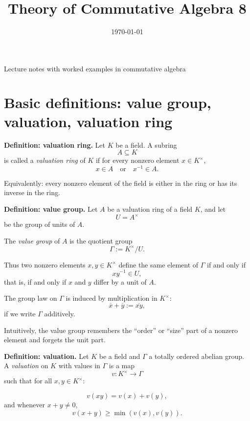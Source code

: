 \documentclass[12pt,a4paper]{article}
\title{\vspace{-1.5em}\bfseries Theory of Commutative Algebra 8}
\author{}
\date{\today}
\theoremstyle{notespace}
\begin{document}
	\maketitle
	\thispagestyle{plain}
		\begin{center}
		\begin{minipage}{0.92\textwidth}
			Lecture notes with worked examples in commutative algebra
		\end{minipage}
	\end{center}
		\tableofcontents
	\clearpage
	
	
\section{Basic definitions: value group, valuation, valuation ring}

\textbf{Definition: valuation ring.}
Let \(K\) be a field. A subring
\[
A\subseteq K
\]
is called a \emph{valuation ring} of \(K\) if for every nonzero element \(x\in K^\times\),
\[
x\in A
\quad \text{or} \quad
x^{-1}\in A.
\]

Equivalently: every nonzero element of the field is either in the ring or has its inverse in the ring.

\medskip

\textbf{Definition: value group.}
Let \(A\) be a valuation ring of a field \(K\), and let
\[
U=A^\times
\]
be the group of units of \(A\).

The \emph{value group} of \(A\) is the quotient group
\[
\Gamma:=K^\times/U.
\]

Thus two nonzero elements \(x,y\in K^\times\) define the same element of \(\Gamma\) if and only if
\[
xy^{-1}\in U,
\]
that is, if and only if \(x\) and \(y\) differ by a unit of \(A\).

The group law on \(\Gamma\) is induced by multiplication in \(K^\times\):
\[
\overline{x}+\overline{y}:=\overline{xy},
\]
if we write \(\Gamma\) additively.

Intuitively, the value group remembers the ``order'' or ``size'' part of a nonzero element and forgets the unit part.

\medskip

\textbf{Definition: valuation.}
Let \(K\) be a field and \(\Gamma\) a totally ordered abelian group. A \emph{valuation} on \(K\) with values in \(\Gamma\) is a map
\[
v:K^\times\to \Gamma
\]
such that for all \(x,y\in K^\times\):

\[
v(xy)=v(x)+v(y),
\]
and whenever \(x+y\neq 0\),
\[
v(x+y)\ge \min(v(x),v(y)).
\]
\end{document}

